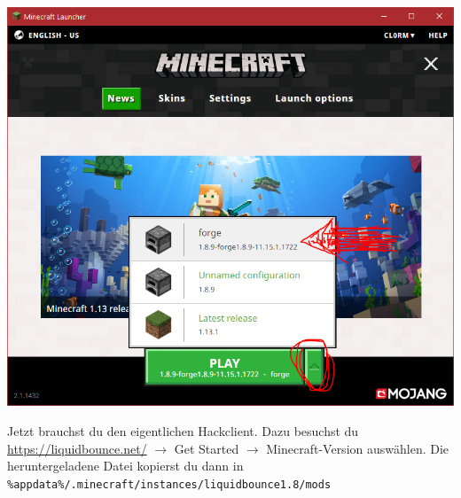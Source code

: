 \includegraphics[scale=0.4, center]{TeX_files/pics/installation_starten.png}

Jetzt brauchst du den eigentlichen Hackclient. Dazu besuchst du \url{https://liquidbounce.net/} $\to$ Get Started $\to$ Minecraft-Version auswählen. Die heruntergeladene Datei kopierst du dann in \\ \texttt{\%appdata\%/.minecraft/instances/liquidbounce1.8/mods}